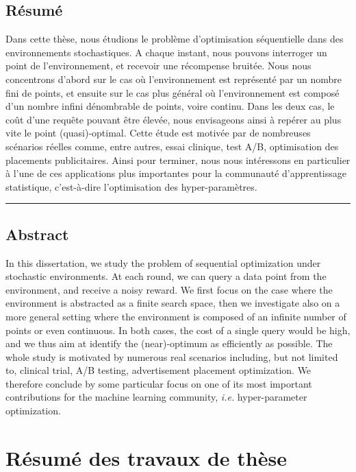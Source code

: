 \section*{\centering R\'esum\'e}

Dans cette th\`ese, nous \'etudions le probl\`eme d'optimisation s\'equentielle dans des enviro\-nnements stochastiques. A chaque instant, nous pouvons interroger un point de l'enviro\-nnement, et recevoir une récompense bruit\'ee. Nous nous concentrons d'abord sur le cas o\`u l'environnement est représenté par un nombre fini de points, et ensuite sur le cas plus g\'en\'eral o\`u l'environnement est composé d'un nombre infini d\'enombrable de points, voire continu. Dans les deux cas, le co\^ut d'une requ\^ete pouvant \^etre \'elev\'ee, nous envisageons ainsi \`a rep\'erer au plus vite le point (quasi)-optimal. Cette \'etude est motiv\'ee par de nombreuses sc\'enarios r\'eelles comme, entre autres, essai clinique, test A/B, optimisation des placements publicitaires. Ainsi pour terminer, nous nous int\'eressons en particulier \`a l'une de ces applications plus importantes pour la communaut\'e d'apprentissage statistique, c'est-\`a-dire l'optimisation des hyper-param\`etres.

\begin{center}
    \rule{8cm}{0.4pt}
\end{center}

\section*{\centering Abstract}

In this dissertation, we study the problem of sequential optimization under stochastic environments. At each round, we can query a data point from the environment, and receive a noisy reward. We first focus on the case where the environment is abstracted as a finite search space, then we investigate also on a more general setting where the environment is composed of an infinite number of points or even continuous. In both cases, the cost of a single query would be high, and we thus aim at identify the (near)-optimum as efficiently as possible. The whole study is motivated by numerous real scenarios including, but not limited to, clinical trial, A/B testing, advertisement placement optimization. We therefore conclude by some particular focus on one of its most important contributions for the machine learning community, \emph{i.e.} hyper-parameter optimization.


\chapter*{R\'esum\'e des travaux de thèse}
